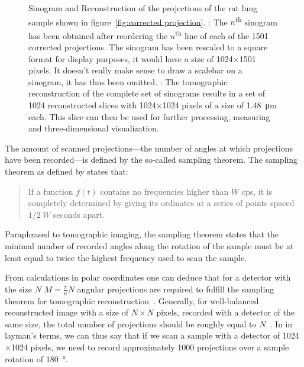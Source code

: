 \begin{figure}
{%
		\label{subfig:rec}%
		}%
	\caption[Sinogram and Reconstruction]{Sinogram and Reconstruction of the projections of the rat lung sample shown in figure~\ref{fig:corrected projection}. : The $n$\textsuperscript{th} sinogram has been obtained after reordering the $n$\textsuperscript{th} line of each of the 1501 corrected projections. The sinogram has been rescaled to a square format for display purposes, it would have a size of 1024$\times$1501 pixels. It doesn't really make sense to draw a scalebar on a sinogram, it has thus been omitted. : The tomographic reconstruction of the complete set of sinograms results in a set of 1024 reconstructed slices with 1024$\times$1024 pixels of a size of \SI{1.48}{\micro\meter} each. This slice can then be used for further processing, measuring and three-dimensional visualization.}
	\label{fig:Sin Rec}
\end{figure}

The amount of scanned projections---the number of angles at which projections have been recorded---is defined by the so-called sampling theorem. The sampling theorem as defined by \citet{Shannon1949} states that: \begin{quote}If a function $f(t)$ contains no frequencies higher than $W$ cps, it is completely determined by giving its ordinates at a series of points spaced $1/2\ W$ seconds apart. \cite{Shannon1949}\end{quote}

Paraphrased to tomographic imaging, the sampling theorem states that the minimal number of recorded angles along the rotation of the sample must be at least equal to twice the highest frequency used to scan the sample.

From calculations in polar coordinates one can deduce that for a detector with the size $N$ $M=\frac{\pi}{n}N$ angular projections are required to fulfill the sampling theorem for tomographic reconstruction~\cite{Stampanoni2002a}. Generally, for well-balanced reconstructed image with a size of $N\times N$ pixels, recorded with a detector of the same size, the total number of projections should be roughly equal to $N$~\cite{Kak2002}. In in layman's terms, we can thus say that if we scan a sample with a detector of 1024$\times$1024 pixels, we need to record approximately 1000 projections over a sample rotation of \SI{180}{\degree}.


